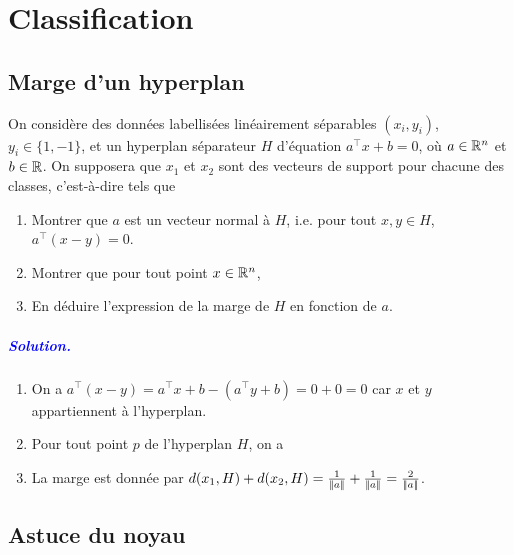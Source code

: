 \chapter{Classification}

\section{Marge d'un hyperplan}

On considère des données labellisées linéairement séparables $(x_i,y_i)$, $y_i \in \{1,-1\}$, et un hyperplan séparateur $H$ d'équation $a^\top x + b = 0$, où $a \in \mathbb{R}^n$ et $b \in \mathbb{R}$. On supposera que $x_1$ et $x_2$ sont des vecteurs de support pour chacune des classes, c'est-à-dire tels que 

\begin{enumerate}
	\item Montrer que $a$ est un vecteur normal à $H$, i.e. pour tout $x,y \in H$, $a^\top (x-y) = 0$.
	\item Montrer que pour tout point $x \in \mathbb{R}^n$,
	\item En déduire l'expression de la marge de $H$ en fonction de $a$.
\end{enumerate}

\paragraph{\textcolor{blue}{Solution.}}
\begin{enumerate}
	\item On a $a^\top(x-y) = a^\top x + b - (a^\top y +b) = 0 + 0 = 0$ car $x$ et $y$ appartiennent à l'hyperplan.
	\item Pour tout point $p$ de l'hyperplan $H$, on a
	
	\item La marge est donnée par $d(x_1,H) + d(x_2,H) = \frac{1}{|\!| a |\!|} + \frac{1}{|\!| a |\!|} = \frac{2}{|\!| a |\!|}$.
\end{enumerate}


\section{Astuce du noyau}

